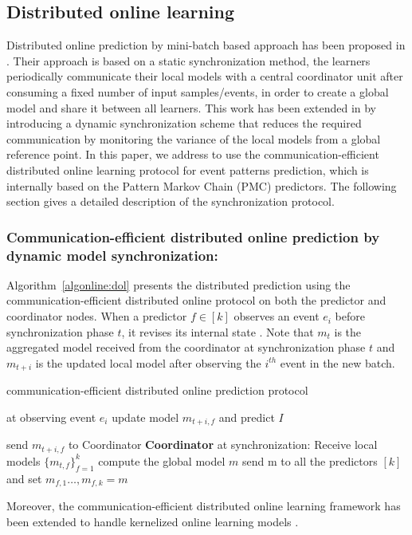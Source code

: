\subsection{Distributed online learning}

Distributed online prediction by mini-batch based approach has been proposed in \cite{dekel2012optimal}. Their approach is based on a static synchronization method,  the learners periodically communicate  their local models with a central coordinator unit after consuming a fixed number of input samples/events, in order to  create a global model and share it between all learners. This work has been extended in \cite{kamp2014communication} by introducing a
dynamic synchronization scheme that reduces the required communication by monitoring the variance of the local models from a global reference point. In this paper, we address to use the communication-efficient distributed online learning protocol for event patterns prediction, which is internally based on the Pattern Markov Chain (PMC) predictors. The following section gives a detailed description of the synchronization protocol.
\subsubsection*{Communication-efficient distributed online prediction by dynamic model synchronization:}

Algorithm~\ref{algonline:dol} presents the distributed prediction using the communication-efficient distributed online protocol on both the predictor and coordinator nodes. When a predictor $f\in[k]$ observes an event $e_i$ before synchronization phase $t$, it revises its internal state . Note that $m_t$ is the aggregated model received from the coordinator at synchronization phase $t$ and $m_{t+i}$ is the updated local model after observing the $i^{th}$ event in the new batch.

\begin{algorithm}
	\caption{communication-efficient distributed online prediction protocol} 
	\begin{algorithmic}[1] 
		 at observing event $e_i$
		\Statex \Indp update model $m_{t+i,f}$ and predict $I$

		\Statex {}  
		\Statex send $m_{t+i,f}$ to Coordinator 
		\Statex \Indm \Indm \textbf{Coordinator} at synchronization:
		\Statex \Indp Receive local models $\{m_{t,f}\}_{f=1}^k$ 	
		\Statex  compute the global model $m$ 
		\Statex send m to all the predictors $[k]$ and set $m_{f,1}\dots, m_{f,k}=m$
	\end{algorithmic}
	\label{algonline:dol}
\end{algorithm}


Moreover, the communication-efficient distributed online learning framework has been extended to handle kernelized online learning models \cite{kamp2016communication}.
